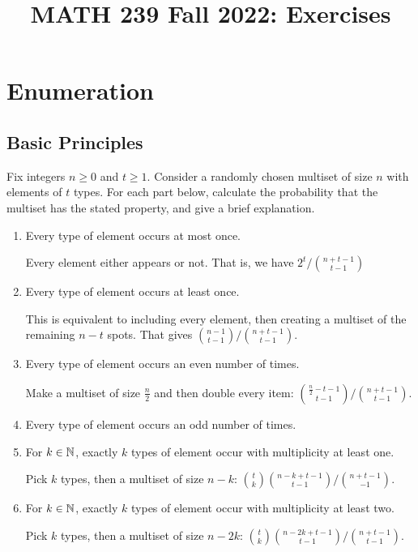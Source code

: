 \documentclass[class=math239,notes,tikz]{agony}
\title{MATH 239 Fall 2022: Exercises}
\begin{document}
\tableofcontents
\pagebreak

\chapter{Enumeration}

\section{Basic Principles}

\begin{xca}
  Fix integers $n \geq 0$ and $t \geq 1$.
  Consider a randomly chosen multiset of size $n$ with elements of $t$ types.
  For each part below, calculate the probability that the multiset has the stated property,
  and give a brief explanation.
\end{xca}
\begin{enumerate}
  \item Every type of element occurs at most once.
        \begin{sol}
          Every element either appears or not.
          That is, we have $2^t/\binom{n+t-1}{t-1}$
        \end{sol}
  \item Every type of element occurs at least once.
        \begin{sol}
          This is equivalent to including every element,
          then creating a multiset of the remaining $n-t$ spots.
          That gives $\binom{n-1}{t-1}/\binom{n+t-1}{t-1}$.
        \end{sol}
  \item Every type of element occurs an even number of times.
        \begin{sol}
          Make a multiset of size $\frac{n}{2}$ and then double every item:
          $\binom{\frac{n}{2}-t-1}{t-1}/\binom{n+t-1}{t-1}$.
        \end{sol}
  \item Every type of element occurs an odd number of times.
  \item For $k \in \mathbb{N}$, exactly $k$ types of element occur
        with multiplicity at least one.
        \begin{sol}
          Pick $k$ types, then a multiset of size $n-k$:
          $\binom{t}{k}\binom{n-k+t-1}{t-1}/\binom{n+t-1}{-1}$.
        \end{sol}
  \item For $k \in \mathbb{N}$, exactly $k$ types of element occur
        with multiplicity at least two.
        \begin{sol}
          Pick $k$ types, then a multiset of size $n-2k$:
          $\binom{t}{k}\binom{n-2k+t-1}{t-1}/\binom{n+t-1}{t-1}$.
        \end{sol}
\end{enumerate}
\end{document}
